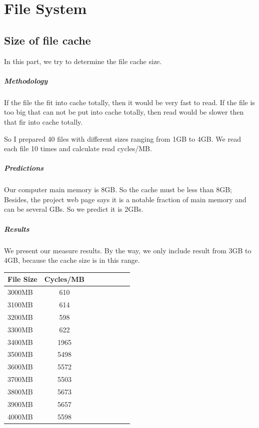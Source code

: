 \chapter{File System}

\section{Size of file cache}
In this part, we try to determine the file cache size.

\paragraph{Methodology}
If the file the fit into cache totally, then it would be very fast to read. If the file is too big that can not be put into cache totally, then read would be slower then that fir into cache totally. 

So I prepared 40 files with different sizes ranging from 1GB to 4GB. We read each file 10 times and calculate  read cycles/MB.

\paragraph{Predictions}
Our computer main memory is 8GB. So the cache must be less than 8GB; Besides, the project web page says it is a notable fraction of main memory and can be several GBs. So we predict it is 2GBs.

\paragraph{Results}
We present our measure results. By the way, we only include result from 3GB to 4GB, because the cache size is in this range.

\begin{center}
\begin{tabular}{l*{6}{c}r}
File Size             &  Cycles/MB\\
\hline
3000MB & 610 \\
3100MB & 614 \\
3200MB & 598 \\
3300MB & 622 \\
3400MB & 1965 \\
3500MB & 5498 \\
3600MB & 5572 \\
3700MB & 5503 \\
3800MB & 5673 \\
3900MB & 5657 \\
4000MB & 5598 \\

\end{tabular}
\end{center}

